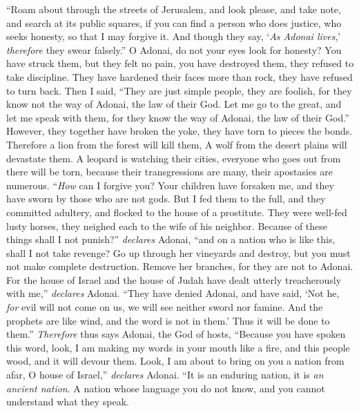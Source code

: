 \begin{biblechapter} %
\verse “Roam about through the streets of Jerusalem, 
and look please, and take note, 
and search at its public squares, 
if you can find a person who does justice, 
who seeks honesty, 
so that I may forgive it.
\verse And though they say, ‘\textit{As Adonai lives},’ 
\textit{therefore} they swear falsely.”
\verse O Adonai, do not your eyes look for honesty? 
You have struck them, but they felt no pain, 
you have destroyed them, they refused to take discipline. 
They have hardened their faces more than rock, 
they have refused to turn back.
\verse Then I said, “They are just simple people, 
they are foolish, 
for they know not the way of Adonai, 
the law of their God.
\verse Let me go to the great, 
and let me speak with them, 
for they know the way of Adonai, 
the law of their God.” 
However, they together have broken the yoke, 
they have torn to pieces the bonds.
\verse Therefore a lion from the forest will kill them, 
A wolf from the desert plains will devastate them. 
A leopard is watching their cities, 
everyone who goes out from there will be torn, 
because their transgressions are many, 
their apostasies are numerous.
\verse “\textit{How} can I forgive you? 
Your children have forsaken me, 
and they have sworn by those who are not gods. 
But I fed them to the full, 
and they committed adultery, 
and flocked to the house of a prostitute.
\verse They were well-fed lusty horses, 
they neighed each to the wife of his neighbor.
\verse Because of these things shall I not punish?” \textit{declares} Adonai, 
“and on a nation who is like this, shall I not take revenge?
\verse Go up through her vineyards and destroy, 
but you must not make complete destruction. 
Remove her branches, 
for they are not to Adonai.
\verse For the house of Israel and the house of Judah 
have dealt utterly treacherously with me,” \textit{declares} Adonai.
\verse “They have denied Adonai, and have said, 
‘Not he, \textit{for} evil will not come on us, 
we will see neither sword nor famine.
\verse And the prophets are like wind, 
and the word is not in them.’ 
Thus it will be done to them.”
\verse \textit{Therefore} thus says Adonai, the God of hosts, 
“Because you have spoken this word, 
look, I am making my words in your mouth like a fire, 
and this people wood, and it will devour them.
\verse Look, I am about to bring on you a nation from afar, 
O house of Israel,” \textit{declares} Adonai. 
“It is an enduring nation, it is \textit{an ancient nation}. 
A nation whose language you do not know, 
and you cannot understand what they speak.

\end{biblechapter}

